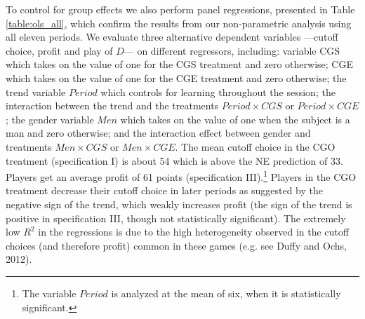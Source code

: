 \documentclass[12pt, letterpaper]{article}
\theoremstyle{plain}
\begin{document}
To control for group effects we also perform panel regressions, presented in Table \ref{table:ols_all}, which confirm the results from our non-parametric analysis using all eleven periods. We evaluate three alternative dependent variables ---cutoff choice, profit and play of $D$---  on different regressors, including: variable CGS which takes on the value of one for the CGS treatment and zero otherwise; CGE which takes on the value of one for the CGE treatment and zero otherwise; the trend variable $Period$ which controls for learning throughout the session; the interaction between the trend and the treatments $Period \times CGS$ or $Period \times CGE$; the gender variable $Men$ which takes on the value of one when the subject is a man and zero otherwise; and the interaction effect between gender and treatments $Men \times CGS$ or $Men \times CGE$. The mean cutoff choice in the CGO treatment (specification I) is about 54 which is above the NE prediction of 33. Players get an average profit of 61 points (specification III).\footnote{The variable $Period$ is analyzed at the mean of six, when it is statistically significant.} Players in the CGO treatment decrease their cutoff choice in later periods as suggested by the negative sign of the trend, which weakly increases profit (the sign of the trend is positive in specification III, though not statistically significant). The extremely low $R^2$ in the regressions is due to the high heterogeneity observed in the cutoff choices (and therefore profit) common in these games (e.g. see Duffy and Ochs, 2012).\\
\end{document}
